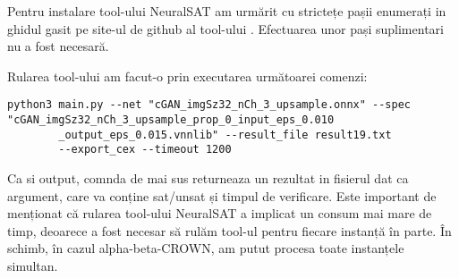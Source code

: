 Pentru instalare tool-ului NeuralSAT am urmărit cu strictețe pașii enumerați in ghidul gasit pe site-ul de github al tool-ului \cite{read_neuralsat.md}. Efectuarea unor pași suplimentari nu a fost necesară.

Rularea tool-ului am facut-o prin executarea următoarei comenzi:
    \begin{lstlisting}[style=bashstyle]
    python3 main.py --net "cGAN_imgSz32_nCh_3_upsample.onnx" --spec "cGAN_imgSz32_nCh_3_upsample_prop_0_input_eps_0.010
        _output_eps_0.015.vnnlib" --result_file result19.txt 
        --export_cex --timeout 1200
   \end{lstlisting}
Ca si output, comnda de mai sus returneaza un rezultat in fisierul dat ca argument, care va conține sat/unsat și timpul de verificare.
Este important de menționat că rularea tool-ului NeuralSAT a implicat un consum mai mare de timp, deoarece a fost necesar să rulăm tool-ul pentru fiecare instanță în parte. În schimb, în cazul alpha-beta-CROWN, am putut procesa toate instanțele simultan. 